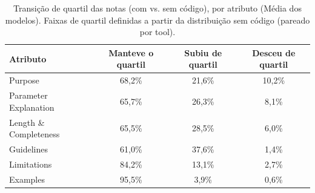 \begin{table}[H]
\centering
\caption{Transição de quartil das notas (com vs. sem código), por atributo (Média dos modelos). Faixas de quartil definidas a partir da distribuição sem código (pareado por tool).}
\label{tab:transicao_quartis_media}
\begin{tabular}{lccc}
\toprule
Atributo & Manteve o quartil & Subiu de quartil & Desceu de quartil \\
\midrule
Purpose & 68,2\% & 21,6\% & 10,2\% \\
Parameter Explanation & 65,7\% & 26,3\% & 8,1\% \\
Length \& Completeness & 65,5\% & 28,5\% & 6,0\% \\
Guidelines & 61,0\% & 37,6\% & 1,4\% \\
Limitations & 84,2\% & 13,1\% & 2,7\% \\
Examples & 95,5\% & 3,9\% & 0,6\% \\
\bottomrule
\end{tabular}
\end{table}
